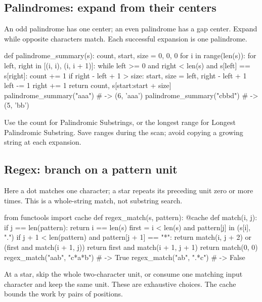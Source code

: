 \documentclass[11pt]{article}
\begin{document}
\subsection{Palindromes: expand from their centers}
An odd palindrome has one center; an even palindrome has a gap center.
Expand while opposite characters match. Each successful expansion is one palindrome.
\par\noindent\begin{minipage}{\linewidth}
\hypertarget{example-start-58}{}
\begin{pyex}
def palindrome_summary(s):
    count, start, size = 0, 0, 0
    for i in range(len(s)):
        for left, right in [(i, i), (i, i + 1)]:
            while left >= 0 and right < len(s) and s[left] == s[right]:
                count += 1
                if right - left + 1 > size:
                    start, size = left, right - left + 1
                left -= 1
                right += 1
    return count, s[start:start + size]
palindrome_summary("aaa")            # -> (6, 'aaa')
palindrome_summary("cbbd")           # -> (5, 'bb')
\end{pyex}
\hypertarget{example-end-58}{}
\end{minipage}\par
Use the count for Palindromic Substrings, or the longest range for Longest Palindromic Substring.
Save ranges during the scan; avoid copying a growing string at each expansion.

\subsection{Regex: branch on a pattern unit}
Here a dot matches one character; a star repeats its preceding unit zero or more times.
This is a whole-string match, not substring search.
\par\noindent\begin{minipage}{\linewidth}
\hypertarget{example-start-59}{}
\begin{pyex}
from functools import cache
def regex_match(s, pattern):
    @cache
    def match(i, j):
        if j == len(pattern):
            return i == len(s)
        first = i < len(s) and pattern[j] in (s[i], ".")
        if j + 1 < len(pattern) and pattern[j + 1] == "*":
            return match(i, j + 2) or (first and match(i + 1, j))
        return first and match(i + 1, j + 1)
    return match(0, 0)
regex_match("aab", "c*a*b")          # -> True
regex_match("ab", ".*c")            # -> False
\end{pyex}
\hypertarget{example-end-59}{}
\end{minipage}\par
At a star, skip the whole two-character unit, or consume one matching input character and keep the same unit.
These are exhaustive choices. The cache bounds the work by pairs of positions.
\end{document}
